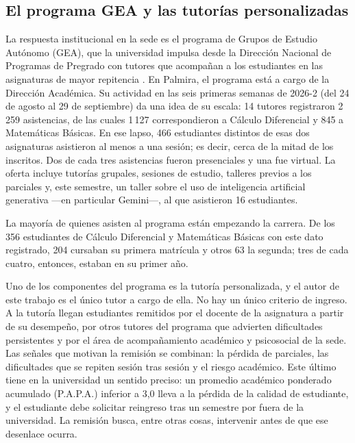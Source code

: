 \subsection*{El programa GEA y las tutorías personalizadas}

La respuesta institucional en la sede es el programa de Grupos de Estudio Autónomo (GEA), que la universidad impulsa desde la Dirección Nacional de Programas de Pregrado con tutores que acompañan a los estudiantes en las asignaturas de mayor repitencia \parencite{unal2021gea}. En Palmira, el programa está a cargo de la Dirección Académica. Su actividad en las seis primeras semanas de 2026-2 (del 24 de agosto al 29 de septiembre) da una idea de su escala: 14 tutores registraron 2\,259 asistencias, de las cuales 1\,127 correspondieron a Cálculo Diferencial y 845 a Matemáticas Básicas. En ese lapso, 466 estudiantes distintos de esas dos asignaturas asistieron al menos a una sesión; es decir, cerca de la mitad de los inscritos. Dos de cada tres asistencias fueron presenciales y una fue virtual. La oferta incluye tutorías grupales, sesiones de estudio, talleres previos a los parciales y, este semestre, un taller sobre el uso de inteligencia artificial generativa ---en particular Gemini---, al que asistieron 16 estudiantes.

La mayoría de quienes asisten al programa están empezando la carrera. De los 356 estudiantes de Cálculo Diferencial y Matemáticas Básicas con este dato registrado, 204 cursaban su primera matrícula y otros 63 la segunda; tres de cada cuatro, entonces, estaban en su primer año.

Uno de los componentes del programa es la tutoría personalizada, y el autor de este trabajo es el único tutor a cargo de ella. No hay un único criterio de ingreso. A la tutoría llegan estudiantes remitidos por el docente de la asignatura a partir de su desempeño, por otros tutores del programa que advierten dificultades persistentes y por el área de acompañamiento académico y psicosocial de la sede. Las señales que motivan la remisión se combinan: la pérdida de parciales, las dificultades que se repiten sesión tras sesión y el riesgo académico. Este último tiene en la universidad un sentido preciso: un promedio académico ponderado acumulado (P.A.P.A.) inferior a 3,0 lleva a la pérdida de la calidad de estudiante, y el estudiante debe solicitar reingreso tras un semestre por fuera de la universidad. La remisión busca, entre otras cosas, intervenir antes de que ese desenlace ocurra.

